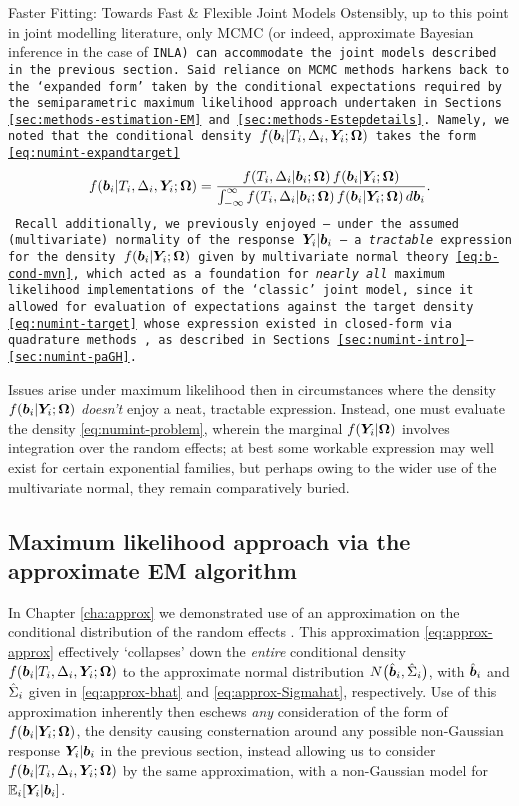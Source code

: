 \begin{chapter}{\label{cha:flexible}Faster Fitting: Towards Fast \& Flexible Joint Models}
Ostensibly, up to this point in joint modelling literature, only MCMC (or indeed, approximate Bayesian inference in the case of \tt{INLA}) can accommodate the joint models described in the previous section. Said reliance on MCMC methods harkens back to the `expanded form' taken by the conditional expectations required by the semiparametric maximum likelihood approach undertaken in Sections \ref{sec:methods-estimation-EM} and \ref{sec:methods-Estepdetails}. Namely, we noted that the conditional density $f\!\left(\bm{b}_i|T_i, \Delta_i, \bm{Y}_i; \bm{\mathrm{\Omega}}\right)$ takes the form \eqref{eq:numint-expandtarget}
\begin{equation*}
    f\!\left(\bm{b}_i|T_i, \Delta_i, \bm{Y}_i; \bm{\mathrm{\Omega}}\right)=\frac{f\!\left( T_i,\Delta_i|\bm{b}_i;\bm{\mathrm{\Omega}}\right)f\!\left(\bm{b}_i|\bm{Y}_i;\bm{\mathrm{\Omega}}\right)}{\int_{-\infty}^\infty f\!\left( T_i,\Delta_i|\bm{b}_i;\bm{\mathrm{\Omega}}\right)f\!\left(\bm{b}_i|\bm{Y}_i;\bm{\mathrm{\Omega}}\right) d\bm{b}_i}.
\end{equation*}
Recall additionally, we previously enjoyed -- under the assumed (multivariate) normality of the response $\bm{Y}_i|\bm{b}_i$ -- a \textit{tractable} expression for the density $f\!\left(\bm{b}_i|\bm{Y}_i;\bm{\mathrm{\Omega}}\right)$ given by multivariate normal theory \eqref{eq:b-cond-mvn}, which acted as a foundation for \textit{nearly all} maximum likelihood implementations of the `classic' joint model, since it allowed for evaluation of expectations against the target density \eqref{eq:numint-target} whose expression existed in closed-form via \eg quadrature methods \citep{Wulfsohn97}, as described in Sections \ref{sec:numint-intro}--\ref{sec:numint-paGH}.

Issues arise under maximum likelihood then in circumstances where the density $f\!\left(\bm{b}_i|\bm{Y}_i;\bm{\mathrm{\Omega}}\right)$ \textit{doesn't} enjoy a neat, tractable expression. Instead, one must evaluate the density \eqref{eq:numint-problem}, wherein the marginal $f\!\left(\bm{Y}_i|\bm{\mathrm{\Omega}}\right)$ involves integration over the random effects; at best some workable expression may well exist for certain exponential families, but perhaps owing to the wider use of the multivariate normal, they remain comparatively buried. 

\subsection{Maximum likelihood approach via the approximate EM algorithm}\label{sec:flexible-intro-bernhardt}
In Chapter \ref{cha:approx} we demonstrated use of an approximation on the conditional distribution of the random effects \citep{Bernhardt15, Murray2022}. This approximation \eqref{eq:approx-approx} effectively `collapses' down the \textit{entire} conditional density $f\!\left(\bm{b}_i|T_i, \Delta_i, \bm{Y}_i; \bm{\mathrm{\Omega}}\right)$ to the approximate normal distribution $N\big(\hat{\bm{b}}_i,\hat{\Sigma}_i\big)$, with $\hat{\bm{b}}_i$ and $\hat{\Sigma}_i$ given in \eqref{eq:approx-bhat} and \eqref{eq:approx-Sigmahat}, respectively. Use of this approximation inherently then eschews \textit{any} consideration of the form of $f\!\left(\bm{b}_i|\bm{Y}_i;\bm{\mathrm{\Omega}}\right)$, the density causing consternation around any possible non-Gaussian response $\bm{Y}_i|\bm{b}_i$ in the previous section, instead allowing us to consider $f\!\left(\bm{b}_i|T_i, \Delta_i, \bm{Y}_i; \bm{\mathrm{\Omega}}\right)$ by the same approximation, with a non-Gaussian model for $\mathbb{E}_i\!\left[\bm{Y}_i|\bm{b}_i\right]$. 


\end{chapter}
